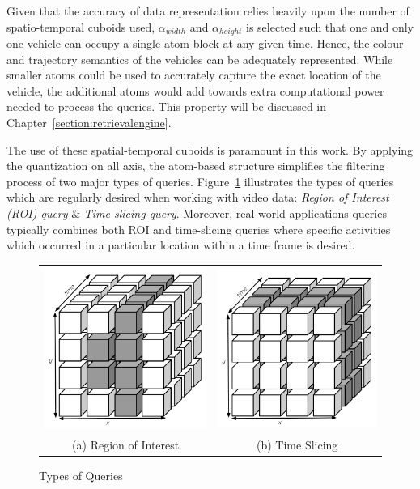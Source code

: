 Given that the accuracy of data representation relies heavily upon the number of spatio-temporal cuboids used, $\alpha_{width}$ and $\alpha_{height}$ is selected such that one and only one vehicle can occupy a single atom block at any given time. Hence, the colour and trajectory semantics of the vehicles can be adequately represented.
While smaller atoms could be used to accurately capture the exact location of the vehicle, the additional atoms would add towards extra computational power needed to process the queries. This property will be discussed in Chapter~\ref{section:retrievalengine}.

The use of these spatial-temporal cuboids is paramount in this work.
By applying the quantization on all axis, the atom-based structure simplifies the filtering process of two major types of queries.
Figure~\ref{fig:typesofQuery} illustrates the types of queries which are regularly desired when working with video data: \textit{Region of Interest (ROI) query} \& \textit{Time-slicing query}.
Moreover, real-world applications queries typically combines both ROI and time-slicing queries where specific activities which occurred in a particular location within a time frame is desired.


\begin{figure}[htb!]
  \centering


\begin{tabular}{cc}
 \includegraphics[width=0.3\linewidth]{image/general/atom_ROI.PNG} &  \includegraphics[width=0.3\linewidth]{image/general/atom_time_slicing.PNG}\\
(a) Region of Interest & (b) Time Slicing
\end{tabular}


\caption{Types of Queries} \label{fig:typesofQuery}
\end{figure}



